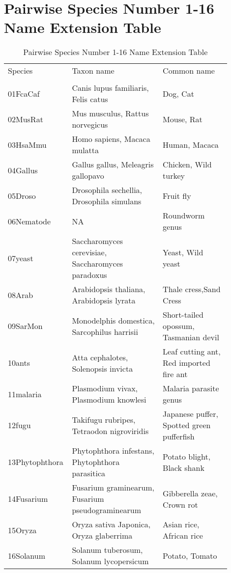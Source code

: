 \section*{\normalfont Pairwise Species Number 1-16 Name Extension Table}
\footnotesize
{\RaggedRight 
\begin{table}[ht]
\renewcommand{\arraystretch}{1}
\begin{tabular}{p{0.2\linewidth} p{0.4\linewidth} p{0.3\linewidth}}
\hline
Species & Taxon name & Common name \\\\
\hline
01FcaCaf        & Canis lupus familiaris, Felis catus               & Dog, Cat\\
02MusRat        & Mus musculus, Rattus norvegicus                   & Mouse, Rat\\
03HsaMmu        & Homo sapiens, Macaca mulatta                      & Human, Macaca\\
04Gallus        & Gallus gallus, Meleagris gallopavo                & Chicken, Wild turkey\\
05Droso         & Drosophila sechellia, Drosophila simulans         & Fruit fly\\
06Nematode      & NA                                                & Roundworm genus\\
07yeast         & Saccharomyces cerevisiae, Saccharomyces paradoxus & Yeast, Wild yeast\\
08Arab          & Arabidopsis thaliana, Arabidopsis lyrata          & Thale cress,Sand Cress\\
09SarMon        & Monodelphis domestica, Sarcophilus harrisii       & Short-tailed opossum, Tasmanian devil\\
10ants          & Atta cephalotes, Solenopsis invicta               & Leaf cutting ant, Red imported fire ant\\
11malaria       & Plasmodium vivax, Plasmodium knowlesi             & Malaria parasite genus\\
12fugu          & Takifugu rubripes, Tetraodon nigroviridis         & Japanese puffer, Spotted green pufferfish \\
13Phytophthora  & Phytophthora infestans, Phytophthora parasitica   & Potato blight, Black shank\\
14Fusarium      & Fusarium graminearum, Fusarium pseudograminearum  & Gibberella zeae, Crown rot\\
15Oryza         & Oryza sativa Japonica, Oryza glaberrima           & Asian rice, African rice\\
16Solanum       & Solanum tuberosum, Solanum lycopersicum           & Potato, Tomato\\
\hline
\end{tabular}
\caption{Pairwise Species Number 1-16 Name Extension Table}
\end{table}}
\label{tab:spec_name}
\newpage


